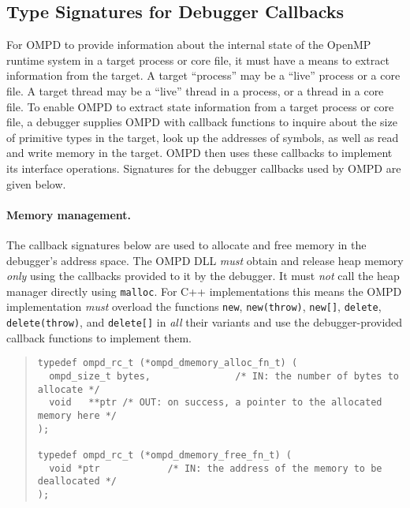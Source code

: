 \subsection{Type Signatures for Debugger Callbacks}
For OMPD to provide information  about the internal state
of the OpenMP runtime system in a target process or core file,
it must have a means to extract information from
the target.
A target ``process'' may be a ``live'' process or a core file. 
A target thread may be a ``live'' thread in a process, or a thread in a core 
file.
To enable OMPD to extract state information from a target process or core file,
a debugger supplies OMPD with callback functions to inquire
about the size of primitive types in the target,
look up the addresses of symbols,
as well as read and write memory in the target.
OMPD then uses these callbacks to implement its interface operations.
Signatures for the debugger callbacks used by OMPD are given below.

\paragraph{Memory management.}
The callback signatures below are used to allocate and free
memory in the debugger's address space.
The OMPD DLL \emph{must} obtain and release heap memory \emph{only}
using the callbacks provided to it by the debugger.
It must \emph{not} call the heap manager directly using \texttt{malloc}.
For C++ implementations this means the OMPD implementation \emph{must}
overload the functions \texttt{new}, 
\texttt{new(throw)}, \texttt{new[]}, \texttt{delete}, \texttt{delete(throw)}, 
and \texttt{delete[]} in \emph{all} their variants and use the
debugger-provided callback functions to implement them.
\begin{quote}
\begin{lstlisting}
typedef ompd_rc_t (*ompd_dmemory_alloc_fn_t) (
  ompd_size_t bytes,               /* IN: the number of bytes to allocate */
  void   **ptr /* OUT: on success, a pointer to the allocated memory here */
);

typedef ompd_rc_t (*ompd_dmemory_free_fn_t) (
  void *ptr            /* IN: the address of the memory to be deallocated */
);
\end{lstlisting}
\end{quote}

